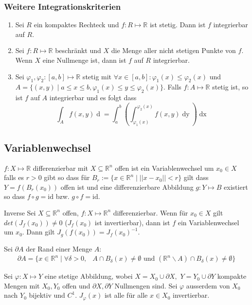 \documentclass[a4paper,10pt]{article}
\def\R{\mathbb{R}}
\begin{document}
\subsubsection*{Weitere Integrationskriterien}
\begin{enumerate}
  \item Sei \(R\) ein kompaktes Rechteck und \(f: R \mapsto \R\) ist stetig. Dann ist \(f\) integrierbar auf \(R\).
  \item Sei \(f: R \mapsto \R\) beschränkt und \(X\) die Menge aller nicht stetigen Punkte von \(f\). Wenn \(X\) eine Nullmenge ist, dann ist \(f\) auf \(R\) integrierbar.
  \item Sei \(\varphi_1, \varphi_2: \left[a,b\right]\mapsto \R\) stetig mit \(\forall x \in \left[a,b\right]: \varphi_1(x) \le \varphi_2(x)\) und \(A = \{(x,y)\mid a\le x \le b, \varphi_1(x) \le y \le \varphi_2(x)\}\). Falls \(f: A \mapsto \R\) stetig ist, so ist \(f\) auf \(A\) integrierbar und es folgt dass
  \[\int_A f(x,y) \mathop{d(x,y)} = \int_a^b \left(\int_{\varphi_1(x)}^{\varphi_2(x)} f(x,y) \mathop{dy}\right) \mathop{dx}\]
\end{enumerate}

\subsection{Variablenwechsel}

$f: X \mapsto \R$ differenzierbar mit $X \subseteq \R^n$ offen ist ein Variablenwechsel um $x_0 \in X$ falls es $r > 0$ gibt so dass für $B_r := \{x \in \R^n \mid ||x-x_0|| < r \}$ gilt dass $Y = f(B_r(x_0))$ offen ist und eine differenzierbare Abbildung $g: Y \mapsto B$ existiert so dass $f \circ g = \mathrm{id}$ bzw. $g \circ f = \mathrm{id}$.

\begin{subbox}{Inverse}
  Sei $X \subseteq \R^n$ offen, $f: X \mapsto \R^n$ differenzierbar. Wenn für $x_0 \in X$ gilt $det(J_f(x_0)) \neq 0$ ($J_f(x_0)$ ist invertierbar), dann ist $f$ ein Variablenwechsel um $x_0$. Dann gilt $J_g(f(x_0)) = J_f(x_0)^{-1}$.
\end{subbox}

Sei \(\partial A\) der Rand einer Menge \(A\):
\begin{align*}
    \partial A = \Big\{ x \in \R^n \mid \forall \delta > 0, &A \cap B_\delta(x) \neq \emptyset \text{ und } (\R^n \backslash A) \cap B_\delta(x) \neq \emptyset \Big\}
\end{align*}

Sei \(\varphi : X \mapsto Y\) eine stetige Abbildung, wobei \(X=  X_0 \cup \partial X, \) \(Y = Y_0 \cup \partial Y\) kompakte Mengen mit \(X_0, Y_0\) offen und \(\partial X, \partial Y\) Nullmengen sind. Sei $\varphi$ ausserdem von $X_0$ nach $Y_0$ bijektiv und $C^1$. $J_\varphi(x)$ ist alle für alle $x \in X_0$ invertierbar.
\end{document}
